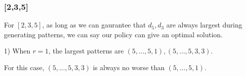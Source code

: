 
%
%
%
%
%
%
%
%
%
%

\subsubsection{[2,3,5]}

For $[2,3,5]$, as long as we can gaurantee that $d_5,d_3$ are always largest during generating patterns, we can say our policy can give an optimal solution.


1) When $r = 1$, the largest patterns are $(5,\ldots,5,1),(5,\ldots,5,3,3)$.

For this case, $(5,\ldots,5,3,3)$ is always no worse than $(5,\ldots,5,1)$.

